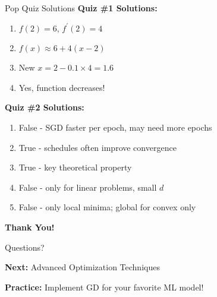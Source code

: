 \documentclass[usenames,dvipsnames]{beamer}
\begin{document}

  \begin{frame}{Pop Quiz Solutions}
    \textbf{Quiz \#1 Solutions:} 
    \begin{enumerate}
        \item $f(2) = 6$, $f^{\prime}(2) = 4$
        \item $f(x) \approx 6 + 4(x-2)$
        \item New $x = 2 - 0.1 \times 4 = 1.6$
        \item Yes, function decreases!
    \end{enumerate}
    
    \pause
    \textbf{Quiz \#2 Solutions:}
    \begin{enumerate}
        \item False - SGD faster per epoch, may need more epochs
        \item True - schedules often improve convergence
        \item True - key theoretical property  
        \item False - only for linear problems, small $d$
        \item False - only local minima; global for convex only
    \end{enumerate}
  \end{frame}

  \begin{frame}
    \centering
    \Huge \textbf{Thank You!}
    
    \vspace{1cm}
    \Large Questions?
    
    \vspace{1cm}
    \normalsize
    \textbf{Next:} Advanced Optimization Techniques
    
    \textbf{Practice:} Implement GD for your favorite ML model!
  \end{frame}
\end{document}
